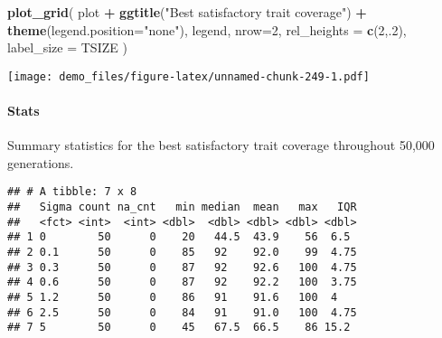 \documentclass[]{book}
\newenvironment{Shaded}{\begin{snugshade}}{\end{snugshade}}
\newcommand{\DataTypeTok}[1]{\textcolor[rgb]{0.13,0.29,0.53}{#1}}
\newcommand{\DecValTok}[1]{\textcolor[rgb]{0.00,0.00,0.81}{#1}}
\newcommand{\KeywordTok}[1]{\textcolor[rgb]{0.13,0.29,0.53}{\textbf{#1}}}
\newcommand{\NormalTok}[1]{#1}
\newcommand{\OperatorTok}[1]{\textcolor[rgb]{0.81,0.36,0.00}{\textbf{#1}}}
\newcommand{\OtherTok}[1]{\textcolor[rgb]{0.56,0.35,0.01}{#1}}
\newcommand{\StringTok}[1]{\textcolor[rgb]{0.31,0.60,0.02}{#1}}
\let\oldparagraph\paragraph
\renewcommand{\paragraph}[1]{\oldparagraph{#1}\mbox{}}
\begin{document}
\begin{Shaded}
\begin{Highlighting}[]
\KeywordTok{plot_grid}\NormalTok{(}
\NormalTok{  plot }\OperatorTok{+}
\StringTok{    }\KeywordTok{ggtitle}\NormalTok{(}\StringTok{"Best satisfactory trait coverage"}\NormalTok{) }\OperatorTok{+}
\StringTok{    }\KeywordTok{theme}\NormalTok{(}\DataTypeTok{legend.position=}\StringTok{"none"}\NormalTok{),}
\NormalTok{  legend,}
  \DataTypeTok{nrow=}\DecValTok{2}\NormalTok{,}
  \DataTypeTok{rel_heights =} \KeywordTok{c}\NormalTok{(}\DecValTok{2}\NormalTok{,.}\DecValTok{2}\NormalTok{),}
  \DataTypeTok{label_size =}\NormalTok{ TSIZE}
\NormalTok{)}
\end{Highlighting}
\end{Shaded}

\texttt{[image: demo\_files/figure-latex/unnamed-chunk-249-1.pdf]}

\hypertarget{stats-47}{%
\paragraph{Stats}\label{stats-47}}

Summary statistics for the best satisfactory trait coverage throughout 50,000 generations.

\begin{Shaded}
\end{Shaded}

\begin{verbatim}
## # A tibble: 7 x 8
##   Sigma count na_cnt   min median  mean   max   IQR
##   <fct> <int>  <int> <dbl>  <dbl> <dbl> <dbl> <dbl>
## 1 0        50      0    20   44.5  43.9    56  6.5 
## 2 0.1      50      0    85   92    92.0    99  4.75
## 3 0.3      50      0    87   92    92.6   100  4.75
## 4 0.6      50      0    87   92    92.2   100  3.75
## 5 1.2      50      0    86   91    91.6   100  4   
## 6 2.5      50      0    84   91    91.0   100  4.75
## 7 5        50      0    45   67.5  66.5    86 15.2
\end{verbatim}
\end{document}

